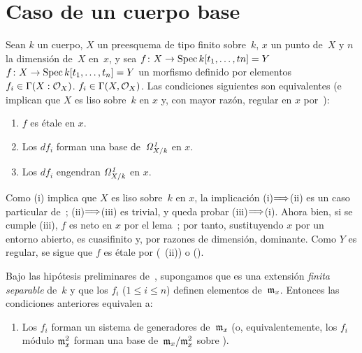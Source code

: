 
\section{Caso de un cuerpo base}
\label{II.5}

\begin{proposition}
\label{II.5.1}
Sean $k$ un cuerpo, $X$ un preesquema de tipo finito sobre~$k$, $x$ un punto de~$X$ y $n$ la dimensión de~$X$ en~$x$, y sea
{$f\colon X\to\Spec k[t_1,\dots,tn]=Y$}
{$f\colon X\to\Spec k[t_1,\dots,t_n]=Y$}
un morfismo definido por elementos
{$f_i\in\Gamma(X:\cal{O}_X)$.}
{$f_i\in\Gamma(X,\cal{O}_X)$.}
Las condiciones siguientes son equivalentes (e implican que $X$ es liso sobre~$k$ en $x$ y, con mayor razón, regular en $x$ por~):
\begin{enumerate}
\item[(i)] $f$ es étale en $x$.
\item[(ii)] Los $df_i$ forman una base de~$\it{\Omega}_{X/k}^1$ en $x$.
\item[(iii)] Los $df_i$ engendran $\it{\Omega}_{X/k}^1$ en $x$.
\end{enumerate}
\end{proposition}

Como (i) implica que $X$ es liso sobre~$k$ en $x$, la implicación (i)$\To$(ii) es un caso particular de~; (ii)$\To$(iii) es trivial, y queda probar (iii)$\To$(i). Ahora bien, si se cumple (iii), $f$ es neto en $x$ por el lema~; por tanto, sustituyendo $x$ por un entorno abierto, es cuasifinito y, por razones de dimensión, dominante. Como $Y$ es regular, se sigue que $f$ es étale por (~(ii)) o ().

\begin{corollaire}
\label{II.5.2}
Bajo las hipótesis preliminares de~, supongamos que
es una extensión \emph{finita separable} de~$k$ y que los $f_i$ ($1\leq i\leq n$) definen elementos de~$\goth{m}_x$. Entonces las condiciones anteriores equivalen a:
\begin{enumerate}
\item[(iv)] Los $f_i$ forman un sistema de generadores de~$\goth{m}_x$ (o, equivalentemente, los $f_i$ módulo $\goth{m}_x^2$ forman una base de~$\goth{m}_x/\goth{m}_x^2$ sobre
).
\end{enumerate}
\end{corollaire}

